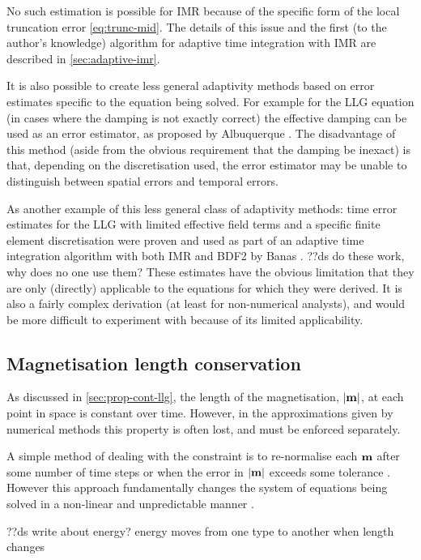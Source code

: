 No such estimation is possible for IMR because of the specific form of the local truncation error \eqref{eq:trunc-mid}.
The details of this issue and the first (to the author's knowledge) algorithm for adaptive time integration with IMR are described in \cref{sec:adaptive-imr}.

It is also possible to create less general adaptivity methods based on error estimates specific to the equation being solved.
For example for the LLG equation (in cases where the damping is not exactly correct) the effective damping can be used as an error estimator, as proposed by Albuquerque \etal \cite{Albuquerque2001}.
The disadvantage of this method (aside from the obvious requirement that the damping be inexact) is that, depending on the discretisation used, the error estimator may be unable to distinguish between spatial errors and temporal errors.

As another example of this less general class of adaptivity methods: time error estimates for the LLG with limited effective field terms and a specific finite element discretisation were proven and used as part of an adaptive time integration algorithm with both IMR and BDF2 by Banas \cite{Banas-thesis}.
??ds do these work, why does no one use them?
These estimates have the obvious limitation that they are only (directly) applicable to the equations for which they were derived.
It is also a fairly complex derivation (at least for non-numerical analysts), and would be more difficult to experiment with because of its limited applicability.


\subsection{Magnetisation length conservation}
\label{sec:ensuring-constant-mv}

As discussed in \cref{sec:prop-cont-llg}, the length of the magnetisation, $\left|{\mathbf{m}} \right|$, at each point in space is constant over time.
However, in the approximations given by numerical methods this property is often lost, and must be enforced separately.

A simple method of dealing with the constraint is to re-normalise each $\mathbf{m}$ after some number of time steps or when the error in $\left|{\mathbf{m}} \right|$ exceeds some tolerance \cite{Fidler2000}.
However this approach fundamentally changes the system of equations being solved in a non-linear and unpredictable manner \cite{Lewis2003}.

??ds write about energy? energy moves from one type to another when length changes

